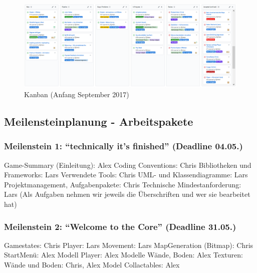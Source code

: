 \documentclass{article}
\begin{document}
\begin{figure}
	\centering
	\includegraphics[width=1\textwidth]{kanban.png}
	\caption{Kanban (Anfang September 2017)
		\label{fig:kanban}}
\end{figure}

\newpage

\subsection{Meilensteinplanung - Arbeitspakete}


\subsubsection{Meilenstein 1: “technically it’s finished” (Deadline 04.05.)}
Game-Summary (Einleitung): Alex\newline
Coding Conventions: Chris\newline
Bibliotheken und Frameworks: Lars\newline
Verwendete Tools: Chris\newline
UML- und Klassendiagramme: Lars\newline
Projektmanagement, Aufgabenpakete: Chris\newline
Technische Mindestanforderung: Lars\newline
(Als Aufgaben nehmen wir jeweils die Überschriften und wer sie bearbeitet hat)\newline
\newline
\subsubsection{Meilenstein 2: “Welcome to the Core” (Deadline 31.05.)}
Gamestates: Chris\newline
Player: Lars\newline
Movement: Lars
MapGeneration (Bitmap): Chris\newline
StartMenü: Alex\newline
Modell Player: Alex\newline
Modelle Wände, Boden: Alex\newline
Texturen: Wände und Boden: Chris, Alex\newline
Model Collactables: Alex\newline
\newline
\end{document}
